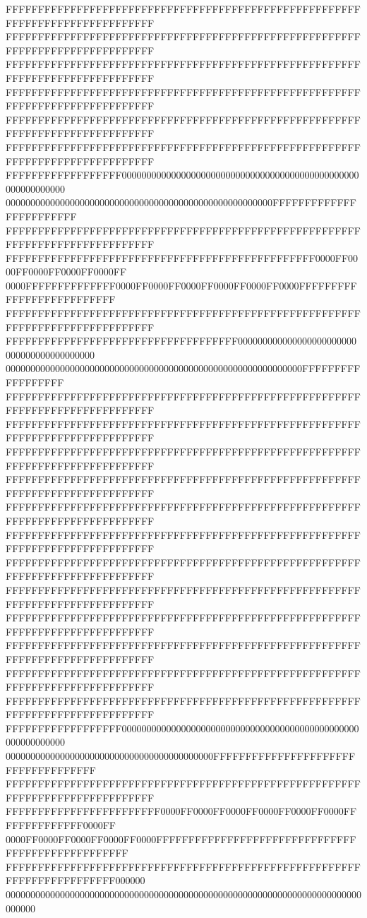 FFFFFFFFFFFFFFFFFFFFFFFFFFFFFFFFFFFFFFFFFFFFFFFFFFFFFFFFFFFFFFFFFFFFFFFFFFFFFF
FFFFFFFFFFFFFFFFFFFFFFFFFFFFFFFFFFFFFFFFFFFFFFFFFFFFFFFFFFFFFFFFFFFFFFFFFFFFFF
FFFFFFFFFFFFFFFFFFFFFFFFFFFFFFFFFFFFFFFFFFFFFFFFFFFFFFFFFFFFFFFFFFFFFFFFFFFFFF
FFFFFFFFFFFFFFFFFFFFFFFFFFFFFFFFFFFFFFFFFFFFFFFFFFFFFFFFFFFFFFFFFFFFFFFFFFFFFF
FFFFFFFFFFFFFFFFFFFFFFFFFFFFFFFFFFFFFFFFFFFFFFFFFFFFFFFFFFFFFFFFFFFFFFFFFFFFFF
FFFFFFFFFFFFFFFFFFFFFFFFFFFFFFFFFFFFFFFFFFFFFFFFFFFFFFFFFFFFFFFFFFFFFFFFFFFFFF
FFFFFFFFFFFFFFFFFF000000000000000000000000000000000000000000000000000000000000
000000000000000000000000000000000000000000000000000000FFFFFFFFFFFFFFFFFFFFFFFF
FFFFFFFFFFFFFFFFFFFFFFFFFFFFFFFFFFFFFFFFFFFFFFFFFFFFFFFFFFFFFFFFFFFFFFFFFFFFFF
FFFFFFFFFFFFFFFFFFFFFFFFFFFFFFFFFFFFFFFFFFFFFFFF0000FF0000FF0000FF0000FF0000FF
0000FFFFFFFFFFFFFF0000FF0000FF0000FF0000FF0000FF0000FFFFFFFFFFFFFFFFFFFFFFFFFF
FFFFFFFFFFFFFFFFFFFFFFFFFFFFFFFFFFFFFFFFFFFFFFFFFFFFFFFFFFFFFFFFFFFFFFFFFFFFFF
FFFFFFFFFFFFFFFFFFFFFFFFFFFFFFFFFFFF000000000000000000000000000000000000000000
000000000000000000000000000000000000000000000000000000000000FFFFFFFFFFFFFFFFFF
FFFFFFFFFFFFFFFFFFFFFFFFFFFFFFFFFFFFFFFFFFFFFFFFFFFFFFFFFFFFFFFFFFFFFFFFFFFFFF
FFFFFFFFFFFFFFFFFFFFFFFFFFFFFFFFFFFFFFFFFFFFFFFFFFFFFFFFFFFFFFFFFFFFFFFFFFFFFF
FFFFFFFFFFFFFFFFFFFFFFFFFFFFFFFFFFFFFFFFFFFFFFFFFFFFFFFFFFFFFFFFFFFFFFFFFFFFFF
FFFFFFFFFFFFFFFFFFFFFFFFFFFFFFFFFFFFFFFFFFFFFFFFFFFFFFFFFFFFFFFFFFFFFFFFFFFFFF
FFFFFFFFFFFFFFFFFFFFFFFFFFFFFFFFFFFFFFFFFFFFFFFFFFFFFFFFFFFFFFFFFFFFFFFFFFFFFF
FFFFFFFFFFFFFFFFFFFFFFFFFFFFFFFFFFFFFFFFFFFFFFFFFFFFFFFFFFFFFFFFFFFFFFFFFFFFFF
FFFFFFFFFFFFFFFFFFFFFFFFFFFFFFFFFFFFFFFFFFFFFFFFFFFFFFFFFFFFFFFFFFFFFFFFFFFFFF
FFFFFFFFFFFFFFFFFFFFFFFFFFFFFFFFFFFFFFFFFFFFFFFFFFFFFFFFFFFFFFFFFFFFFFFFFFFFFF
FFFFFFFFFFFFFFFFFFFFFFFFFFFFFFFFFFFFFFFFFFFFFFFFFFFFFFFFFFFFFFFFFFFFFFFFFFFFFF
FFFFFFFFFFFFFFFFFFFFFFFFFFFFFFFFFFFFFFFFFFFFFFFFFFFFFFFFFFFFFFFFFFFFFFFFFFFFFF
FFFFFFFFFFFFFFFFFFFFFFFFFFFFFFFFFFFFFFFFFFFFFFFFFFFFFFFFFFFFFFFFFFFFFFFFFFFFFF
FFFFFFFFFFFFFFFFFFFFFFFFFFFFFFFFFFFFFFFFFFFFFFFFFFFFFFFFFFFFFFFFFFFFFFFFFFFFFF
FFFFFFFFFFFFFFFFFF000000000000000000000000000000000000000000000000000000000000
000000000000000000000000000000000000000000FFFFFFFFFFFFFFFFFFFFFFFFFFFFFFFFFFFF
FFFFFFFFFFFFFFFFFFFFFFFFFFFFFFFFFFFFFFFFFFFFFFFFFFFFFFFFFFFFFFFFFFFFFFFFFFFFFF
FFFFFFFFFFFFFFFFFFFFFFFF0000FF0000FF0000FF0000FF0000FF0000FFFFFFFFFFFFFF0000FF
0000FF0000FF0000FF0000FF0000FFFFFFFFFFFFFFFFFFFFFFFFFFFFFFFFFFFFFFFFFFFFFFFFFF
FFFFFFFFFFFFFFFFFFFFFFFFFFFFFFFFFFFFFFFFFFFFFFFFFFFFFFFFFFFFFFFFFFFFFFFF000000
000000000000000000000000000000000000000000000000000000000000000000000000000000
